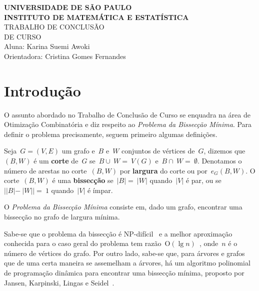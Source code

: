 \documentclass[a4paper,12pt]{article}
\newcommand{\Oh}{\mathrm{O}}
\begin{document}
 
\begin{center}
   {\large \textbf{UNIVERSIDADE DE SÃO PAULO}} \\[1.4cm]
   
   {\large \textbf{INSTITUTO DE MATEMÁTICA E ESTATÍSTICA}}\\[4.2cm]
   
   {\Huge TRABALHO DE CONCLUSÃO }\\[0.3cm]
   {\Huge DE CURSO }\\[9cm]
   
   {\large { Aluna: Karina Suemi Awoki}}\\[0.3cm]
   
   {\large { Orientadora: Cristina Gomes Fernandes}}
   

\end{center}

\newpage
\tableofcontents

\newpage


\section{Introdução}

O assunto abordado no Trabalho de Conclusão de Curso se
enquadra na área de Otimização Combinatória e diz respeito ao 
\emph{Problema da Bissecção Mínima}. Para definir o problema 
precisamente, seguem primeiro algumas definições. 

Seja~$G=(V,E)$ um grafo e~$B$ e~$W$ conjuntos de vértices de~$G$,
dizemos que~$(B,W)$ é um \textbf{corte}
de~$G$ se~$B \cup~W =~V(G)$ e~$B\cap~W =~\emptyset$.
Denotamos o número de arestas no corte~$(B,W)$ por \textbf{largura}
do corte ou por~$e_G(B,W)$.
O corte~$(B,W)$ é uma \textbf{bissecção} se~$|B| =~|W|$
quando~$|V|$ é par, ou se~$||B|-~|W|| =~1$ quando~$|V|$ é ímpar.

O \emph{Problema da Bissecção Mínima} consiste em, dado um grafo, 
encontrar uma bissecção no grafo de largura mínima.

Sabe-se que o problema da bissecção é NP-difícil~\cite{GareyJS76} 
e a melhor aproximação conhecida para o caso geral do problema tem 
razão~$\Oh(\lg n)$~\cite{Racke08}, onde~$n$ é o número de vértices 
do grafo. 
Por outro lado, sabe-se que, para árvores e grafos que de uma 
certa maneira se assemelham a árvores, há um algoritmo polinomial 
de programação dinâmica para encontrar uma bissecção mínima, 
proposto por Jansen, Karpinski, Lingas e 
Seidel~\cite{JansenKLS01}. 
\end{document}
